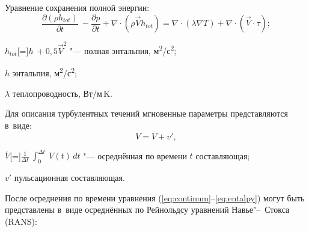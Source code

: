 Уравнение сохранения полной энергии:
\begin{equation}
	\frac{\partial(\rho h_{tot})}{\partial t}~- \frac{\partial p}{\partial t}+\nabla \cdot (\rho \vec{V} h_{tot}) = \nabla \cdot (\lambda \nabla T) + \nabla \cdot (\vec{V} \cdot \tau);
	\label{eq:entalpy}
\end{equation}
\begin{eqexpl}
	\item{\(h_{tot}\)}[=]\( h~+ 0,5 \vec{V}^2\) "--- полная энтальпия, м\textsuperscript{2}/с\textsuperscript{2};
	\item{\(h\)} энтальпия, м\textsuperscript{2}/с\textsuperscript{2};
	\item{\(\lambda\)} теплопроводность, Вт/м\,K.
\end{eqexpl}

Для описания турбулентных течений мгновенные параметры представляются в~виде:
\begin{equation}
	V = \overline{V} + v',
\end{equation}
\begin{eqexpl}
	\item{\(\overline{V}\)}[=]\(\frac{1}{\Delta t}~\int_{0}^{\Delta t}~V(t)\,dt\) "--- осреднённая по времени \(t\) составляющая;
	\item{\(v'\)} пульсационная составляющая.
\end{eqexpl}

После осреднения по времени \autocite{Versteeg1995} уравнения (\ref{eq:continum}--\ref{eq:entalpy}) могут быть представлены в~виде осреднённых по Рейнольдсу уравнений Навье"--~Стокса (RANS):

